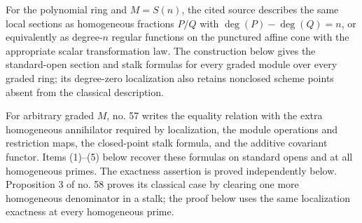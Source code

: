\begin{lemma}
\label{lemma-proj-sheaves}
\begin{reference}
\cite[Chapter III, \S 2, no. 54, Proposition 1,
pp. 246--247]{FAC}
\cite[Chapter III, \S 2, no. 57, pp. 249--250]{FAC}
\cite[Chapter III, \S 2, no. 58, Proposition 3, p. 250]{FAC}
\cite[Chapter III, \S 3, no. 64, Proposition 4 and proof,
pp. 257--258]{FAC}
\end{reference}
\begin{history}
For the polynomial ring and $M = S(n)$, the cited source describes the same
local sections as homogeneous fractions $P/Q$ with
$\deg(P)-\deg(Q)=n$, or equivalently as degree-$n$ regular functions on the
punctured affine cone with the appropriate scalar transformation law. The
construction below gives the standard-open section and stalk formulas for
every graded module over every graded ring; its degree-zero localization
also retains nonclosed scheme points absent from the classical description.

For arbitrary graded $M$, no. 57 writes the equality relation with the extra
homogeneous annihilator required by localization, the module operations and
restriction maps, the closed-point stalk formula, and the additive covariant
functor. Items (1)--(5) below recover these formulas on standard opens and at
all homogeneous primes. The exactness assertion is proved independently
below. Proposition 3 of no. 58 proves its classical case by clearing one
more homogeneous denominator in a stalk; the proof below uses the same
localization exactness at every homogeneous prime.


\end{history}
\end{lemma}
